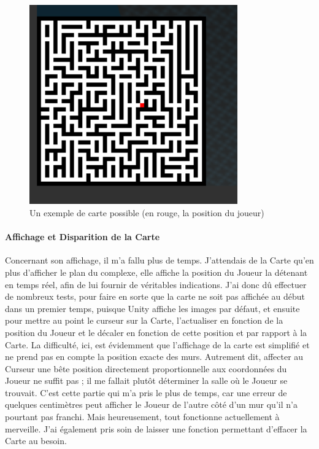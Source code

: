 \documentclass{article}
\begin{document}
\begin{figure}[H]
    \centering
    \includegraphics[width=0.8\textwidth]{Carte2020.png}
    \caption{Un exemple de carte possible (en rouge, la position du joueur)}
    \label{Un exemple de carte possible (en rouge, la position du joueur)}
\end{figure}

\paragraph{Affichage et Disparition de la Carte}
Concernant son affichage, il m'a fallu plus de temps. J'attendais de la Carte qu'en plus d'afficher le plan du complexe, elle affiche la position du Joueur la détenant en temps réel, afin de lui fournir de véritables indications. J'ai donc dû effectuer de nombreux tests, pour faire en sorte que la carte ne soit pas affichée au début dans un premier temps, puisque Unity affiche les images par défaut, et ensuite pour mettre au point le curseur sur la Carte, l'actualiser en fonction de la position du Joueur et le décaler en fonction de cette position et par rapport à la Carte. La difficulté, ici, est évidemment que l'affichage de la carte est simplifié et ne prend pas en compte la position exacte des murs. Autrement dit, affecter au Curseur une bête position directement proportionnelle aux coordonnées du Joueur ne suffit pas ; il me fallait plutôt déterminer la salle où le Joueur se trouvait. C'est cette partie qui m'a pris le plus de temps, car une erreur de quelques centimètres peut afficher le Joueur de l'autre côté d'un mur qu'il n'a pourtant pas franchi. Mais heureusement, tout fonctionne actuellement à merveille. J'ai également pris soin de laisser une fonction permettant d'effacer la Carte au besoin.
\end{document}
